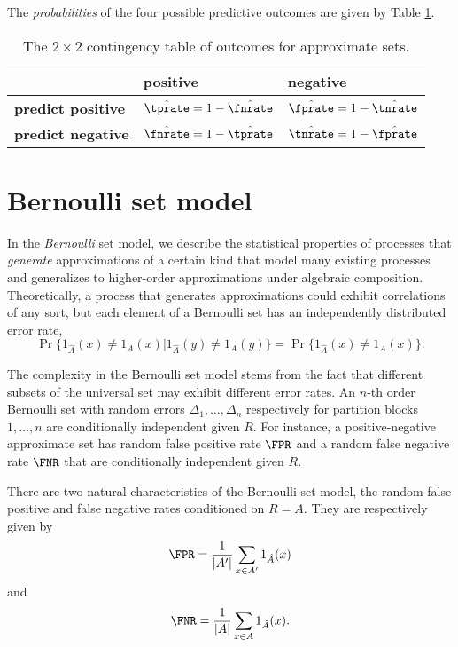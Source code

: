\documentclass[
]{article}
\begin{document}
The \emph{probabilities} of the four possible predictive outcomes are
given by Table \ref{tbl:contingency_table}.

\begin{table}[ht]
    \centering
    \begin{tabular}{@{} l l l @{}}
        \toprule
        & \textbf{positive} & \textbf{negative}\\
        \midrule
        \textbf{predict positive} & $\hat{\tprate}=1-\hat{\fnrate}$ & 
        $\hat{\fprate}=1-\hat{\tnrate}$\\
        \textbf{predict negative} & $\hat{\fnrate}=1-\hat{\tprate}$ & 
        $\hat{\tnrate}=1-\hat{\fprate}$\\
        \bottomrule
    \end{tabular}
    \caption{The $2 \times 2$ contingency table of outcomes for approximate sets.}
    \label{tbl:contingency_table}        
\end{table}

\hypertarget{bernoulli-set-model}{%
\section{Bernoulli set model}\label{bernoulli-set-model}}

In the \emph{Bernoulli} set model, we describe the statistical
properties of processes that \emph{generate} approximations of a certain
kind that model many existing processes and generalizes to higher-order
approximations under algebraic composition. Theoretically, a process
that generates approximations could exhibit correlations of any sort,
but each element of a Bernoulli set has an independently distributed
error rate, \[
\Pr\{1_{\hat A}(x) \neq 1_{A}(x) | 1_{\hat A}(y) \neq 1_{A}(y)\} =
    \Pr\{1_{\hat A}(x) \neq 1_{A}(x)\}.
\]

The complexity in the Bernoulli set model stems from the fact that
different subsets of the universal set may exhibit different error
rates. An \(n\)-th order Bernoulli set with random errors
\(\Delta_1,\ldots,\Delta_n\) respectively for partition blocks
\(1,\ldots,n\) are conditionally independent given \(R\). For instance,
a positive-negative approximate set has random false positive rate
\(\FPR\) and a random false negative rate \(\FNR\) that are
conditionally independent given \(R\).

There are two natural characteristics of the Bernoulli set model, the
random false positive and false negative rates conditioned on \(R = A\).
They are respectively given by \[
    \FPR = \frac{1}{|A'|} \sum_{x \in A'} 1_{\hat A}(x)
\] and \[
    \FNR = \frac{1}{|A|} \sum_{x \in A} 1_{\hat A}(x).
\]
\end{document}
